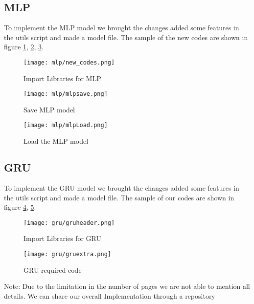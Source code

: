 \subsection{MLP}
To implement the MLP model we brought the changes added some features in the utils script and made a model file. The sample of the new codes are shown in figure \ref{fig:mlp_add_code}, \ref{fig:mlp_sve_code}, \ref{fig:mlp_loading}.
\begin{figure}[H]
    \centering
    \texttt{[image: mlp/new\_codes.png]}
    \caption{Import Libraries for MLP}
    \label{fig:mlp_add_code}
\end{figure}
\begin{figure}[H]
    \centering
    \texttt{[image: mlp/mlpsave.png]}
    \caption{Save MLP model}
    \label{fig:mlp_sve_code}
\end{figure}
\begin{figure}[H]
    \centering
    \texttt{[image: mlp/mlpLoad.png]}
    \caption{Load the MLP model}
    \label{fig:mlp_loading}
\end{figure}
\subsection{GRU}
To implement the GRU model we brought the changes added some features in the utils script and made a model file. The sample of our codes are shown in figure \ref{fig:gruheader}, \ref{fig:gruRequired}.
\begin{figure}[H]
    \centering
    \texttt{[image: gru/gruheader.png]}
    \caption{Import Libraries for GRU}
    \label{fig:gruheader}
\end{figure}
\begin{figure}[H]
    \centering
    \texttt{[image: gru/gruextra.png]}
    \caption{GRU required code}
    \label{fig:gruRequired}
\end{figure}

Note: Due to the limitation in the number of pages we are not able to mention all details. We can share our overall Implementation through a repository
